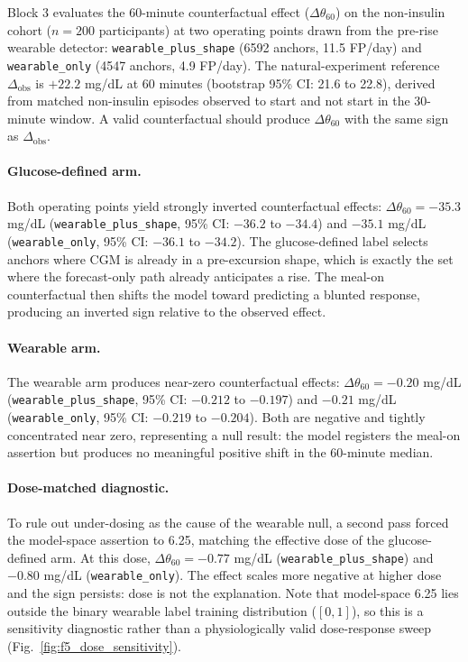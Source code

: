 Block 3 evaluates the 60-minute counterfactual effect ($\Delta\theta_{60}$) on the non-insulin cohort ($n = 200$ participants) at two operating points drawn from the pre-rise wearable detector: \texttt{wearable\_plus\_shape} (6592 anchors, 11.5 FP/day) and \texttt{wearable\_only} (4547 anchors, 4.9 FP/day). The natural-experiment reference $\Delta_{\mathrm{obs}}$ is $+22.2$ mg/dL at 60 minutes (bootstrap 95\% CI: 21.6 to 22.8), derived from matched non-insulin episodes observed to start and not start in the 30-minute window. A valid counterfactual should produce $\Delta\theta_{60}$ with the same sign as $\Delta_{\mathrm{obs}}$.

\paragraph{Glucose-defined arm.}
Both operating points yield strongly inverted counterfactual effects: $\Delta\theta_{60} = -35.3$ mg/dL (\texttt{wearable\_plus\_shape}, 95\% CI: $-36.2$ to $-34.4$) and $-35.1$ mg/dL (\texttt{wearable\_only}, 95\% CI: $-36.1$ to $-34.2$). The glucose-defined label selects anchors where CGM is already in a pre-excursion shape, which is exactly the set where the forecast-only path already anticipates a rise. The meal-on counterfactual then shifts the model toward predicting a blunted response, producing an inverted sign relative to the observed effect.

\paragraph{Wearable arm.}
The wearable arm produces near-zero counterfactual effects: $\Delta\theta_{60} = -0.20$ mg/dL (\texttt{wearable\_plus\_shape}, 95\% CI: $-0.212$ to $-0.197$) and $-0.21$ mg/dL (\texttt{wearable\_only}, 95\% CI: $-0.219$ to $-0.204$). Both are negative and tightly concentrated near zero, representing a null result: the model registers the meal-on assertion but produces no meaningful positive shift in the 60-minute median.

\paragraph{Dose-matched diagnostic.}
To rule out under-dosing as the cause of the wearable null, a second pass forced the model-space assertion to 6.25, matching the effective dose of the glucose-defined arm. At this dose, $\Delta\theta_{60} = -0.77$ mg/dL (\texttt{wearable\_plus\_shape}) and $-0.80$ mg/dL (\texttt{wearable\_only}). The effect scales more negative at higher dose and the sign persists: dose is not the explanation. Note that model-space 6.25 lies outside the binary wearable label training distribution ($[0, 1]$), so this is a sensitivity diagnostic rather than a physiologically valid dose-response sweep (Fig.~\ref{fig:f5_dose_sensitivity}).

